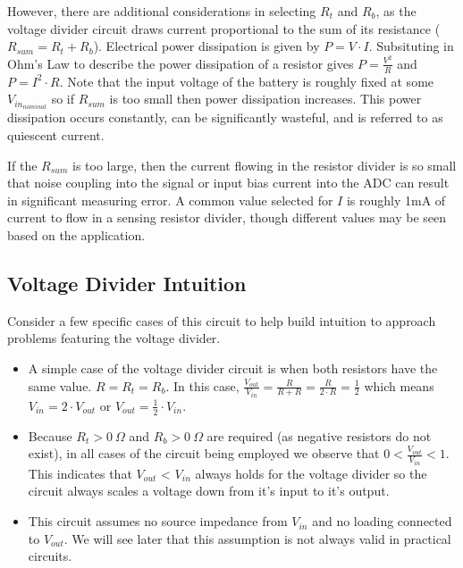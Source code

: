 \documentclass[main.tex]{subfiles}
\begin{document}
\newnoindentpara However, there are additional considerations in selecting $R_t$ and $R_b$, as the voltage divider circuit draws current proportional to the sum of its resistance ($R_{sum} = R_{t} + R_{b}$). Electrical power dissipation is given by $P = V \cdot I$. Subsituting in Ohm's Law to describe the power dissipation of a resistor gives $P = \frac{V^2}{R}$ and $P = I^{2} \cdot R$. Note that the input voltage of the battery is roughly fixed at some $V_{in_{nominal}}$ so if $R_{sum}$ is too small then power dissipation increases. This power dissipation occurs constantly, can be significantly wasteful, and is referred to as quiescent current. \newline

\newnoindentpara If the $R_{sum}$ is too large, then the current flowing in the resistor divider is so small that noise coupling into the signal or input bias current into the ADC can result in significant measuring error. A common value selected for $I$ is roughly 1mA of current to flow in a sensing resistor divider, though different values may be seen based on the application.

\subsection{Voltage Divider Intuition}
Consider a few specific cases of this circuit to help build intuition to approach problems featuring the voltage divider.
\begin{itemize}
    \item A simple case of the voltage divider circuit is when both resistors have the same value. $R = R_t = R_b$. In this case, $\frac{V_{out}}{V_{in}} = \frac{R}{R+R} = \frac{R}{2 \cdot R} = \frac{1}{2}$ which means $V_{in} = 2 \cdot V_{out}$ or $V_{out} = \frac{1}{2} \cdot V_{in}$.
    \item Because $R_t > 0 \ \Omega$ and $R_b > 0 \ \Omega$ are required (as negative resistors do not exist), in all cases of the circuit being employed we observe that $0 < \frac{V_{out}}{V_{in}} < 1$. This indicates that $V_{out}$ < $V_{in}$ always holds for the voltage divider so the circuit always scales a voltage down from it's input to it's output.
    \item This circuit assumes no source impedance from $V_{in}$ and no loading connected to $V_{out}$. We will see later that this assumption is not always valid in practical circuits. 
\end{itemize}
\end{document}
